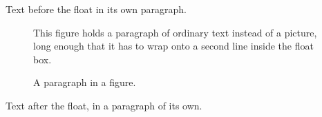 \documentclass[12pt]{article}
\begin{document}
Text before the float in its own paragraph.

\begin{figure}[h]
This figure holds a paragraph of ordinary text instead of a picture, long enough that it has to wrap onto a second line inside the float box.
\caption{A paragraph in a figure.}
\end{figure}

Text after the float, in a paragraph of its own.
\end{document}
